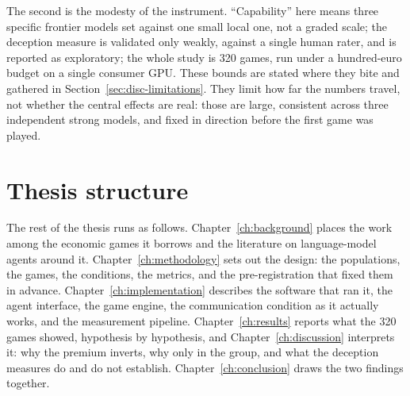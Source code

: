 The second is the modesty of the instrument. ``Capability'' here means three specific frontier
models set against one small local one, not a graded scale; the deception measure is validated only
weakly, against a single human rater, and is reported as exploratory; the whole study is 320 games,
run under a hundred-euro budget on a single consumer GPU. These bounds are stated where they bite
and gathered in Section~\ref{sec:disc-limitations}. They limit how far the numbers travel, not
whether the central effects are real: those are large, consistent across three independent strong
models, and fixed in direction before the first game was played.

\section{Thesis structure}
\label{sec:intro-structure}

The rest of the thesis runs as follows. Chapter~\ref{ch:background} places the work among the
economic games it borrows and the literature on language-model agents around it.
Chapter~\ref{ch:methodology} sets out the design: the populations, the games, the conditions, the
metrics, and the pre-registration that fixed them in advance. Chapter~\ref{ch:implementation}
describes the software that ran it, the agent interface, the game engine, the communication
condition as it actually works, and the measurement pipeline. Chapter~\ref{ch:results} reports what
the 320 games showed, hypothesis by hypothesis, and Chapter~\ref{ch:discussion} interprets it: why
the premium inverts, why only in the group, and what the deception measures do and do not establish.
Chapter~\ref{ch:conclusion} draws the two findings together.
